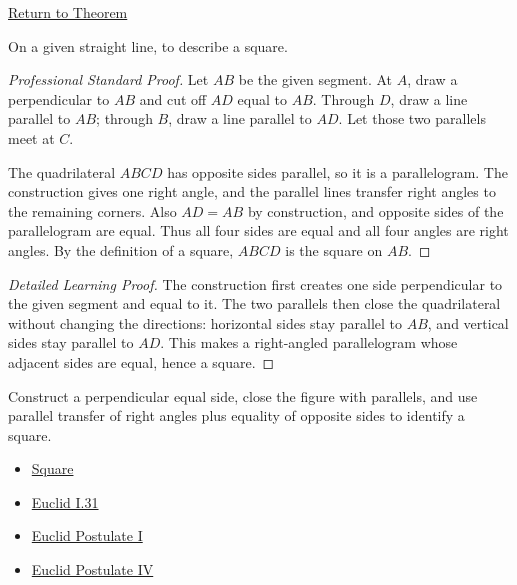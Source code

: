 \newpage
{}
\label{prf:euclid-i-46}

\begin{remark*}[Return]
\hyperref[thm:euclid-i-46]{Return to Theorem}
\end{remark*}

\begin{theorem*}
On a given straight line, to describe a square.
\end{theorem*}



\begin{proof}[Professional Standard Proof]
\LRAProofBodyStart
Let $AB$ be the given segment. At $A$, draw a perpendicular to $AB$ and cut off
$AD$ equal to $AB$. Through $D$, draw a line parallel to $AB$; through $B$,
draw a line parallel to $AD$. Let those two parallels meet at $C$.

The quadrilateral $ABCD$ has opposite sides parallel, so it is a parallelogram.
The construction gives one right angle, and the parallel lines transfer right
angles to the remaining corners. Also $AD=AB$ by construction, and opposite
sides of the parallelogram are equal. Thus all four sides are equal and all
four angles are right angles. By the definition of a square, $ABCD$ is the
square on $AB$.
\end{proof}

\begin{proof}[Detailed Learning Proof]
\LRAProofBodyStart
The construction first creates one side perpendicular to the given segment and
equal to it. The two parallels then close the quadrilateral without changing
the directions: horizontal sides stay parallel to $AB$, and vertical sides stay
parallel to $AD$. This makes a right-angled parallelogram whose adjacent sides
are equal, hence a square.
\end{proof}

\begin{remark*}
Construct a perpendicular equal side, close the figure with parallels, and use
parallel transfer of right angles plus equality of opposite sides to identify a
square.
\end{remark*}

\begin{dependencies}
\begin{itemize}
  \item \hyperref[def:euclid-quadrilateral-classes]{Square}
  \item \hyperref[thm:euclid-i-31]{Euclid I.31}
  \item \hyperref[ax:euclid-postulate-draw-straight-line]{Euclid Postulate I}
  \item \hyperref[ax:euclid-postulate-right-angles-equal]{Euclid Postulate IV}
\end{itemize}
\end{dependencies}

\clearpage
